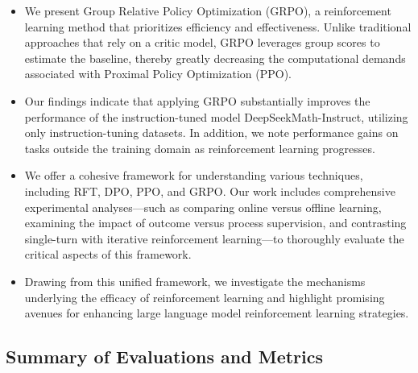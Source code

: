 \begin{itemize}[topsep=0pt]
    \item We present Group Relative Policy Optimization (GRPO), a reinforcement learning method that prioritizes efficiency and effectiveness. Unlike traditional approaches that rely on a critic model, GRPO leverages group scores to estimate the baseline, thereby greatly decreasing the computational demands associated with Proximal Policy Optimization (PPO).
    \item Our findings indicate that applying GRPO substantially improves the performance of the instruction-tuned model DeepSeekMath-Instruct, utilizing only instruction-tuning datasets. In addition, we note performance gains on tasks outside the training domain as reinforcement learning progresses.
    \item We offer a cohesive framework for understanding various techniques, including RFT, DPO, PPO, and GRPO. Our work includes comprehensive experimental analyses—such as comparing online versus offline learning, examining the impact of outcome versus process supervision, and contrasting single-turn with iterative reinforcement learning—to thoroughly evaluate the critical aspects of this framework.
    \item Drawing from this unified framework, we investigate the mechanisms underlying the efficacy of reinforcement learning and highlight promising avenues for enhancing large language model reinforcement learning strategies.
\end{itemize}

\subsection{Summary of Evaluations and Metrics}

